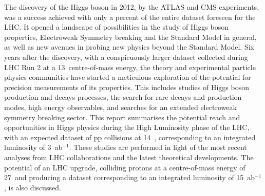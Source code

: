 \documentclass[11pt,twoside,a4paper]{cernrep}
\begin{document}
\begin{titlepage}
\newpage
\begin{center}\begin{abstract}\noindent\end{abstract}\end{center}
The discovery of the Higgs boson in 2012, by the
ATLAS and CMS experiments, was a success achieved with only
a percent of the entire dataset foreseen for the
LHC. 
It opened a landscape of possibilities
in the study of Higgs boson properties, Electroweak Symmetry breaking 
and the Standard Model in general, as well as new avenues in probing new  
physics beyond the Standard Model. 
Six years after the discovery, with a conspicuously larger dataset collected during LHC Run 2
 at a  13~\UTeV centre-of-mass energy, the theory and experimental particle physics communities have
started a meticulous exploration of the potential for precision measurements of its properties.
This includes studies of Higgs boson production and
decays processes, the search for rare decays and production modes, high energy observables, and searches for an extended electroweak symmetry breaking
sector. 
This report summarises the potential reach and opportunities in Higgs physics during the High 
Luminosity phase of the LHC, with an expected dataset of pp collisions at 14~\UTeV, 
corresponding to an integrated luminosity of 3~ab$^{-1}$. These studies are performed in light of the 
most recent analyses from LHC collaborations and the latest theoretical developments. 
The potential of an LHC upgrade, colliding
protons at a centre-of-mass energy of 27~\UTeV and producing a dataset 
corresponding to an integrated luminosity of 15~ab$^{-1}$, is also 
discussed. 






\end{titlepage}
\end{document}
